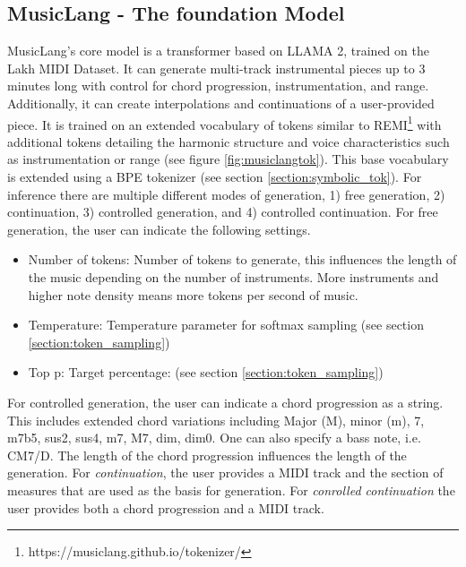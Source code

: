 \subsection{MusicLang - The foundation Model}
MusicLang's core model is a transformer based on LLAMA 2, trained on the Lakh MIDI Dataset\cite{Raffel_2016}. It can generate multi-track instrumental pieces up to 3 minutes long with control for chord progression, instrumentation, and range. Additionally, it can create interpolations and continuations of a user-provided piece. It is trained on an extended vocabulary of tokens similar to REMI\footnote{https://musiclang.github.io/tokenizer/} with additional tokens detailing the harmonic structure and voice characteristics such as instrumentation or range (see figure \ref{fig:musiclangtok}). This base vocabulary is extended using a BPE tokenizer (see section \ref{section:symbolic_tok}). 
For inference there are multiple different modes of generation, 1) free generation, 2) continuation, 3) controlled generation, and 4) controlled continuation. For free generation, the user can indicate the following settings.
\begin{itemize}
\item Number of tokens: Number of tokens to generate, this influences the length of the music depending on the number of instruments. More instruments and higher note density means more tokens per second of music.
\item Temperature: Temperature parameter for softmax sampling (see section \ref{section:token_sampling})
\item Top p: Target percentage: (see section \ref{section:token_sampling}) 
\end{itemize}
For controlled generation, the user can indicate a chord progression as a string. This includes extended chord variations including Major (M), minor (m), 7, m7b5, sus2, sus4, m7, M7, dim, dim0. One can also specify a bass note, i.e. CM7/D. The length of the chord progression influences the length of the generation.
For \textit{continuation}, the user provides a MIDI track and the section of measures that are used as the basis for generation.
For \textit{conrolled continuation} the user provides both a chord progression and a MIDI track. 

